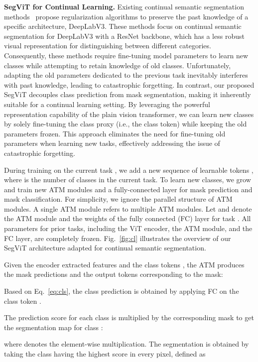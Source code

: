 \textbf{SegViT for Continual Learning.} Existing continual semantic segmentation methods~\cite{zhang2022representation,phan2022class} propose regularization algorithms to preserve the past knowledge of a specific architecture, DeepLabV3. These methods focus on continual semantic segmentation for DeepLabV3 with a ResNet backbone, which has a less robust visual representation for distinguishing between different categories. Consequently, these methods require fine-tuning model parameters to learn new classes while attempting to retain knowledge of old classes. Unfortunately, adapting the old parameters dedicated to the previous task inevitably interferes with past knowledge, leading to catastrophic forgetting.
In contrast, our proposed SegViT decouples class prediction from mask segmentation, making it inherently suitable for a continual learning setting. By leveraging the powerful representation capability of the plain vision transformer, we can learn new classes by solely fine-tuning the class proxy (i.e., the class token) while keeping the old parameters frozen. This approach eliminates the need for fine-tuning old parameters when learning new tasks, effectively addressing the issue of catastrophic forgetting.


During training on the current task , we add a new sequence of learnable tokens , where  is the number of classes in the current task.
To learn new classes, we grow and train new ATM modules and a fully-connected layer for mask prediction and mask classification. For simplicity, we ignore the parallel structure of ATM modules. A single ATM module refers to multiple ATM modules. Let  and  denote the ATM module and the weights of the fully connected  (FC) layer for task . All parameters for prior tasks, including the ViT encoder, the ATM module, and the FC layer, are completely frozen. Fig.~\ref{fig:cl} illustrates the overview of our SegViT architecture adapted for continual semantic segmentation.

Given the encoder extracted features  and the class tokens , the ATM produces the mask predictions  and the output tokens  corresponding to the mask:

Based on Eq.~\ref{eq:cls}, the class prediction  is obtained by applying FC on the class token . 

The prediction score  for each class  is multiplied by the corresponding mask  to get the segmentation map  for class :

where  denotes the element-wise multiplication.
The segmentation  is obtained by taking the class  having the highest score in every pixel, defined as

